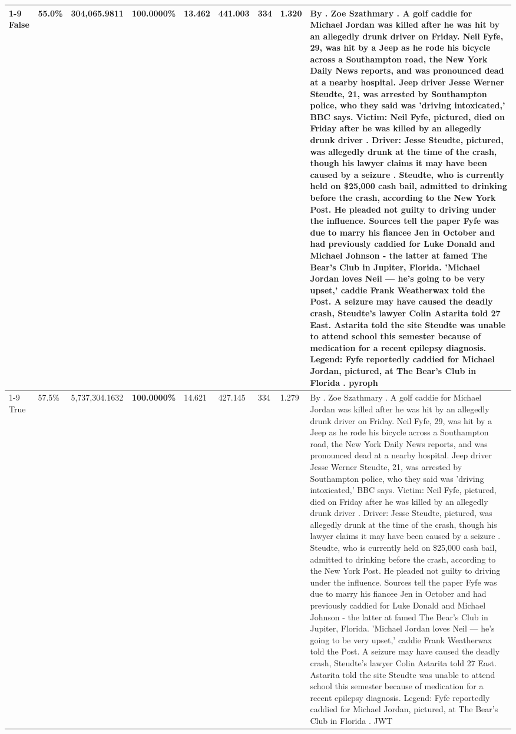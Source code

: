 \begin{table}[H]
\begin{tabular}{lllrlllll}
\cline{1-9}
False & 55.0\% & 304,065.9811 & \bfseries \color{red} 100.0000\% & 13.462 & 441.003 & 334 & 1.320 & By . Zoe Szathmary . A golf caddie for Michael Jordan was killed after he was hit by an allegedly drunk driver on Friday. Neil Fyfe, 29, was hit by a Jeep as he rode his bicycle across a Southampton road, the New York Daily News reports, and was pronounced dead at a nearby hospital. Jeep driver Jesse Werner Steudte, 21, was arrested by Southampton police, who they said was 'driving intoxicated,' BBC says. Victim: Neil Fyfe, pictured, died on Friday after he was killed by an allegedly drunk driver . Driver: Jesse Steudte, pictured, was allegedly drunk at the time of the crash, though his lawyer claims it may have been caused by a seizure . Steudte, who is currently held on \$25,000 cash bail, admitted to drinking before the crash, according to the New York Post. He pleaded not guilty to driving under the influence. Sources tell the paper Fyfe was due to marry his fiancee Jen in October and had previously caddied for Luke Donald and Michael Johnson - the latter at famed The Bear's Club in Jupiter, Florida. 'Michael Jordan loves Neil — he’s going to be very upset,' caddie Frank Weatherwax told the Post. A seizure may have caused the deadly crash, Steudte's lawyer Colin Astarita told 27 East. Astarita told the site Steudte was unable to attend school this semester because of medication for a recent epilepsy diagnosis. Legend: Fyfe reportedly caddied for Michael Jordan, pictured, at The Bear's Club in Florida . pyroph \\
\cline{1-9}
True & 57.5\% & 5,737,304.1632 & \bfseries \color{red} 100.0000\% & 14.621 & 427.145 & 334 & 1.279 & By . Zoe Szathmary . A golf caddie for Michael Jordan was killed after he was hit by an allegedly drunk driver on Friday. Neil Fyfe, 29, was hit by a Jeep as he rode his bicycle across a Southampton road, the New York Daily News reports, and was pronounced dead at a nearby hospital. Jeep driver Jesse Werner Steudte, 21, was arrested by Southampton police, who they said was 'driving intoxicated,' BBC says. Victim: Neil Fyfe, pictured, died on Friday after he was killed by an allegedly drunk driver . Driver: Jesse Steudte, pictured, was allegedly drunk at the time of the crash, though his lawyer claims it may have been caused by a seizure . Steudte, who is currently held on \$25,000 cash bail, admitted to drinking before the crash, according to the New York Post. He pleaded not guilty to driving under the influence. Sources tell the paper Fyfe was due to marry his fiancee Jen in October and had previously caddied for Luke Donald and Michael Johnson - the latter at famed The Bear's Club in Jupiter, Florida. 'Michael Jordan loves Neil — he’s going to be very upset,' caddie Frank Weatherwax told the Post. A seizure may have caused the deadly crash, Steudte's lawyer Colin Astarita told 27 East. Astarita told the site Steudte was unable to attend school this semester because of medication for a recent epilepsy diagnosis. Legend: Fyfe reportedly caddied for Michael Jordan, pictured, at The Bear's Club in Florida . JWT \\

\end{tabular}
\end{table}
